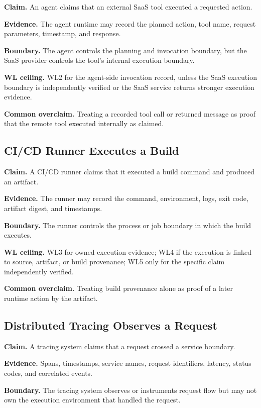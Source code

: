 \documentclass[11pt]{article}
\begin{document}
\textbf{Claim.} An agent claims that an external SaaS tool executed a requested action.

\textbf{Evidence.} The agent runtime may record the planned action, tool name, request parameters, timestamp, and response.

\textbf{Boundary.} The agent controls the planning and invocation boundary, but the SaaS provider controls the tool's internal execution boundary.

\textbf{WL ceiling.} WL2 for the agent-side invocation record, unless the SaaS execution boundary is independently verified or the SaaS service returns stronger execution evidence.

\textbf{Common overclaim.} Treating a recorded tool call or returned message as proof that the remote tool executed internally as claimed.

\subsection{CI/CD Runner Executes a Build}

\textbf{Claim.} A CI/CD runner claims that it executed a build command and produced an artifact.

\textbf{Evidence.} The runner may record the command, environment, logs, exit code, artifact digest, and timestamps.

\textbf{Boundary.} The runner controls the process or job boundary in which the build executes.

\textbf{WL ceiling.} WL3 for owned execution evidence; WL4 if the execution is linked to source, artifact, or build provenance; WL5 only for the specific claim independently verified.

\textbf{Common overclaim.} Treating build provenance alone as proof of a later runtime action by the artifact.

\subsection{Distributed Tracing Observes a Request}

\textbf{Claim.} A tracing system claims that a request crossed a service boundary.

\textbf{Evidence.} Spans, timestamps, service names, request identifiers, latency, status codes, and correlated events.

\textbf{Boundary.} The tracing system observes or instruments request flow but may not own the execution environment that handled the request.
\end{document}
